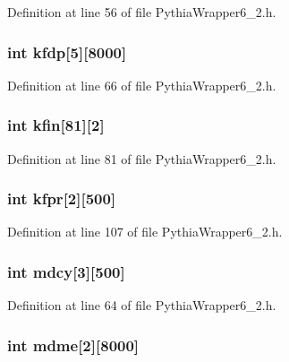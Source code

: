 Definition at line 56 of file Pythia\-Wrapper6\_\-2.h.
\subsubsection{\setlength{\rightskip}{0pt plus 5cm}int {\bf kfdp}[5][8000]}\label{PythiaWrapper6__2_8h_64b7b5c913867cc60afcc36377f317b2}




Definition at line 66 of file Pythia\-Wrapper6\_\-2.h.
\subsubsection{\setlength{\rightskip}{0pt plus 5cm}int {\bf kfin}[81][2]}\label{PythiaWrapper6__2_8h_456aeb577e9c3538f109a4d33b70d79d}




Definition at line 81 of file Pythia\-Wrapper6\_\-2.h.
\subsubsection{\setlength{\rightskip}{0pt plus 5cm}int {\bf kfpr}[2][500]}\label{PythiaWrapper6__2_8h_9b7aa041e3a8a76f368d437881a669b1}




Definition at line 107 of file Pythia\-Wrapper6\_\-2.h.
\subsubsection{\setlength{\rightskip}{0pt plus 5cm}int {\bf mdcy}[3][500]}\label{PythiaWrapper6__2_8h_686748450c8a9b369f6b7d6cb19b6de6}




Definition at line 64 of file Pythia\-Wrapper6\_\-2.h.
\subsubsection{\setlength{\rightskip}{0pt plus 5cm}int {\bf mdme}[2][8000]}\label{PythiaWrapper6__2_8h_cd6218b08738a9aca4ca8fb92425d4a7}




